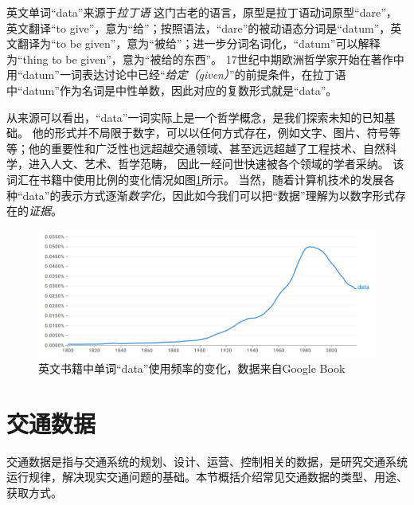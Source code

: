 英文单词“data”来源于\emph{拉丁语}%
%
这门古老的语言，原型是拉丁语动词原型“dare”，英文翻译“to give”，意为“给”；按照语法，“dare”的被动语态分词是“datum”，英文翻译为“to be given”，意为“被给”；进一步分词名词化，“datum”可以解释为“thing to be given”，意为“被给的东西”。
17世纪中期欧洲哲学家开始在著作中用“datum”一词表达讨论中已经“\emph{给定（given）}”的前提条件，在拉丁语中“datum”作为名词是中性单数，因此对应的复数形式就是“data”。

从来源可以看出，“data”一词实际上是一个哲学概念，是我们探索未知的已知基础。
他的形式并不局限于数字，可以以任何方式存在，例如文字、图片、符号等等；他的重要性和广泛性也远超越交通领域、甚至远远超越了工程技术、自然科学，进入人文、艺术、哲学范畴，
因此一经问世快速被各个领域的学者采纳。
该词汇在书籍中使用比例的变化情况如图\ref{fig:data-trend}所示。
当然，随着计算机技术的发展各种“data”的表示方式逐渐\emph{数字化}，因此如今我们可以把“数据”理解为以数字形式存在的\emph{证据}。

\begin{figure}
    \includegraphics[width=\linewidth]{images/data-vocabulary-trend.png}
    \caption{英文书籍中单词“data”使用频率的变化，数据来自Google Book}
    \label{fig:data-trend}
\end{figure}

\section{交通数据}

交通数据是指与交通系统的规划、设计、运营、控制相关的数据，是研究交通系统运行规律，解决现实交通问题的基础。本节概括介绍常见交通数据的类型、用途、获取方式。

